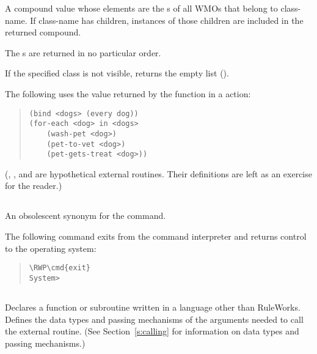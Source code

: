 \ReturnValue

A compound value whose elements are the s of all WMOs
that belong to class-name. If class-name has children, instances of
those children are included in the returned compound.

The s are returned in no particular order.

If the specified class is not visible, returns the empty list
().

\Example

The following uses the value returned by the  function
in a  action:
\begin{quote}
\begin{verbatim}
(bind <dogs> (every dog))
(for-each <dog> in <dogs>
    (wash-pet <dog>)
    (pet-to-vet <dog>)
    (pet-gets-treat <dog>))
\end{verbatim}
\end{quote}

(, , and  are
hypothetical external routines. Their definitions are left as an
exercise for the reader.)

\subsection{}

An obsolescent synonym for the  command.

\Format


\Example

The following command exits from the command interpreter and returns
control to the operating system:

\begin{quote}
\begin{Verbatim}[commandchars=\\\{\}]
\RWP\cmd{exit}
System>
\end{Verbatim}
\end{quote}

\subsection{}

Declares a function or subroutine written in a language other than
RuleWorks. Defines the data types and passing mechanisms of the
arguments needed to call the external routine. (See
Section~\ref{s:calling} for information on data types and passing
mechanisms.)


